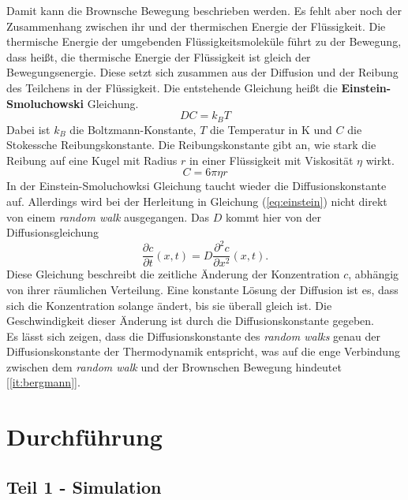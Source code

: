 \documentclass[a4paper, 12pt]{scrartcl}
\begin{document}
Damit kann die Brownsche Bewegung beschrieben werden. Es fehlt aber noch der Zusammenhang zwischen ihr und der thermischen Energie der Flüssigkeit. Die thermische Energie der umgebenden Flüssigkeitsmoleküle führt zu der Bewegung, dass heißt, die thermische Energie der Flüssigkeit ist gleich der Bewegungsenergie. Diese setzt sich zusammen aus der Diffusion und der Reibung des Teilchens in der Flüssigkeit. Die entstehende Gleichung heißt die  \textbf{Einstein-Smoluchowski} Gleichung.
\begin{equation}
  D C = k_B T \label{eq:einstein}
\end{equation}
Dabei ist $k_B$ die Boltzmann-Konstante, $T$ die Temperatur in K und $C$ die Stokessche Reibungskonstante. Die Reibungskonstante gibt an, wie stark die Reibung auf eine Kugel mit Radius $r$ in einer Flüssigkeit mit Viskosität $\eta$ wirkt.
\begin{equation}
  C = 6 \pi \eta r
\end{equation}
In der Einstein-Smoluchowksi Gleichung taucht wieder die Diffusionskonstante auf. Allerdings wird bei der Herleitung in Gleichung (\ref{eq:einstein}) nicht direkt von einem \emph{random walk} ausgegangen. Das $D$ kommt hier von der Diffusionsgleichung
\begin{equation}
  \frac{\partial c}{\partial t}(x, t) = D \frac{\partial^2 c}{\partial x^2} (x, t). \label{eq:diffusion}
\end{equation}
Diese Gleichung beschreibt die zeitliche Änderung der Konzentration $c$, abhängig von ihrer räumlichen Verteilung. Eine konstante Lösung der Diffusion ist es, dass sich die Konzentration solange ändert, bis sie überall gleich ist. Die Geschwindigkeit dieser Änderung ist durch die Diffusionskonstante gegeben.\\
Es lässt sich zeigen, dass die Diffusionskonstante des \emph{random walks} genau der Diffusionskonstante der Thermodynamik entspricht, was auf die enge Verbindung zwischen dem \emph{random walk} und der Brownschen Bewegung hindeutet [\ref{it:bergmann}].

\section*{Durchführung}

\subsection*{Teil 1 - Simulation}
\end{document}
